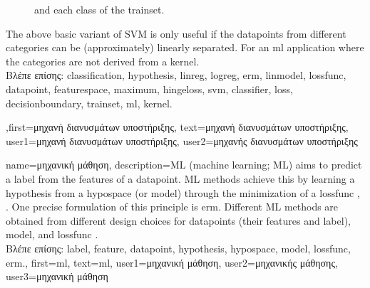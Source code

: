 {{\begin{figure}[H]
\begin{center}
{					and each class of the \gls{trainset}.}
				\label{fig_svm_gls_dict}
			\end{center}
		\end{figure}
		The above basic variant of SVM is only useful if the \gls{datapoint}s from different categories can be  
		(approximately) linearly separated. For an \gls{ml} application where the categories are not 
		derived from a \gls{kernel}.\\
		\foreignlanguage{greek}{Βλέπε επίσης:} \gls{classification}, \gls{hypothesis}, \gls{linreg}, \gls{logreg}, \gls{erm}, \gls{linmodel}, \gls{lossfunc}, \gls{datapoint}, \gls{featurespace}, \gls{maximum}, \gls{hingeloss}, \gls{svm}, \gls{classifier}, \gls{loss}, \gls{decisionboundary}, \gls{trainset}, \gls{ml}, \gls{kernel}.
},first={\foreignlanguage{greek}{μηχανή διανυσμάτων υποστήριξης}},
text={\foreignlanguage{greek}{μηχανή διανυσμάτων υποστήριξης}},
user1={\foreignlanguage{greek}{μηχανή διανυσμάτων υποστήριξης}}, %
user2={\foreignlanguage{greek}{μηχανής διανυσμάτων υποστήριξης}} %
}

{name={\foreignlanguage{greek}{μηχανική μάθηση}},
		 description={ML (machine learning; ML) aims to predict 
	 a \gls{label} from the \gls{feature}s of a \gls{datapoint}. ML methods achieve 
	 this by learning a \gls{hypothesis} from a \gls{hypospace} (or \gls{model}) 
	 through the minimization of a \gls{lossfunc} \cite{MLBasics}, \cite{HastieWainwrightBook}. 
	 One precise formulation of this principle is \gls{erm}. Different ML methods are 
	 obtained from different design choices for \gls{datapoint}s (their \gls{feature}s and \gls{label}), 
	 \gls{model}, and \gls{lossfunc} \cite[Ch. 3]{MLBasics}.\\
	 \foreignlanguage{greek}{Βλέπε επίσης:} \gls{label}, \gls{feature}, \gls{datapoint}, \gls{hypothesis}, \gls{hypospace}, \gls{model}, \gls{lossfunc}, \gls{erm}.},
	first={ml},
	text={ml},
	user1={\foreignlanguage{greek}{μηχανική μάθηση}}, %
	user2={\foreignlanguage{greek}{μηχανικής μάθησης}}, %
	user3={\foreignlanguage{greek}{μηχανική μάθηση}} %
} 

